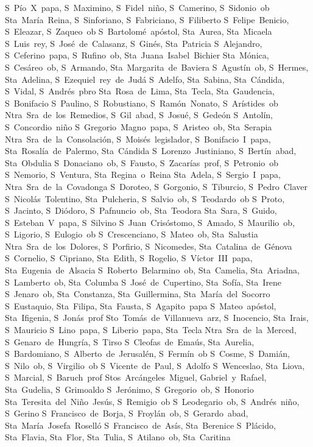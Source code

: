 S~P\'io~X~papa, S~Maximino, S~Fidel~ni\~no, S~Camerino, S~Sidonio~ob
Sta~Mar\'ia~Reina, S~Sinforiano, S~Fabriciano, S~Filiberto
S~Felipe~Benicio, S~Eleazar, S~Zaqueo~ob
S~Bartolom\'e~ap\'ostol, Sta~Aurea, Sta~Micaela
S~Luis~rey, S~Jos\'e~de~Calasanz, S~Gin\'es, Sta~Patricia
S~Alejandro, S~Ceferino~papa, S~Rufino~ob, Sta~Juana~Isabel~Bichier
Sta~M\'onica, S~Ces\'areo~ob, S~Armando, Sta~Margarita~de~Baviera
S~Agust\'in~ob, S~Hermes, Sta~Adelina, S~Ezequiel~rey~de~Jud\'a
S~Adelfo, Sta~Sabina, Sta~C\'andida, S~Vidal, S~Andr\'es~pbro
Sta~Rosa~de~Lima, Sta~Tecla, Sta~Gaudencia, S~Bonifacio
S~Paulino, S~Robustiano, S~Ram\'on~Nonato, S~Ar\'istides~ob
Ntra~Sra~de~los~Remedios, S~Gil~abad, S~Josu\'e, S~Gede\'on
S~Antol\'in, S~Concordio~ni\~no
S~Gregorio~Magno~papa, S~Aristeo~ob, Sta~Serapia
Ntra~Sra~de~la~Consolaci\'on, S~Mois\'es~legislador, S~Bonifacio~I~papa, Sta~Rosal\'ia~de~Palermo, Sta~C\'andida
S~Lorenzo~Justiniano, S~Bert\'in~abad, Sta~Obdulia
S~Donaciano~ob, S~Fausto, S~Zacar\'ias~prof, S~Petronio~ob
S~Nemorio, S~Ventura, Sta~Regina~o~Reina
Sta~Adela, S~Sergio~I~papa, Ntra~Sra~de~la~Covadonga
S~Doroteo, S~Gorgonio, S~Tiburcio, S~Pedro~Claver
S~Nicol\'as~Tolentino, Sta~Pulcheria, S~Salvio~ob, S~Teodardo~ob
S~Proto, S~Jacinto, S~Di\'odoro, S~Pafnuncio~ob, Sta~Teodora
Sta~Sara, S~Guido, S~Esteban~V~papa, S~Silvino
S~Juan~Cris\'ostomo, S~Amado, S~Maurilio~ob, S~Ligorio, S~Eulogio~ob
S~Crescenciano, S~Mateo~ob, Sta~Salustia
Ntra~Sra~de~los~Dolores, S~Porfirio, S~Nicomedes, Sta~Catalina~de~G\'enova
S~Cornelio, S~Cipriano, Sta~Edith, S~Rogelio, S~V\'ictor~III~papa, Sta~Eugenia~de~Alsacia
S~Roberto~Belarmino~ob, Sta~Camelia, Sta~Ariadna, S~Lamberto~ob, Sta~Columba
S~Jos\'e~de~Cupertino, Sta~Sof\'ia, Sta~Irene
S~Jenaro~ob, Sta~Constanza, Sta~Guillermina, Sta~Mar\'ia~del~Socorro
S~Eustaquio, Sta~Filipa, Sta~Fausta, S~Agapito~papa
S~Mateo~ap\'ostol, Sta~Ifigenia, S~Jon\'as~prof
Sto~Tom\'as~de~Villanueva~arz, S~Inocencio, Sta~Irais, S~Mauricio
S~Lino~papa, S~Liberio~papa, Sta~Tecla
Ntra~Sra~de~la~Merced, S~Genaro~de~Hungr\'ia, S~Tirso
S~Cleofas~de~Ema\'us, Sta~Aurelia, S~Bardomiano, S~Alberto~de~Jerusal\'en, S~Ferm\'in~ob
S~Cosme, S~Dami\'an, S~Nilo~ob, S~Virgilio~ob
S~Vicente~de~Paul, S~Adolfo
S~Wenceslao, Sta~Liova, S~Marcial, S~Baruch~prof
Stos~Arc\'angeles~Miguel, Gabriel~y~Rafael, Sta~Gudelia, S~Grimoaldo
S~Jer\'onimo, S~Gregorio~ob, S~Honorio
Sta~Teresita~del~Ni\~no~Jes\'us, S~Remigio~ob
S~Leodegario~ob, S~Andr\'es~ni\~no, S~Gerino
S~Francisco~de~Borja, S~Froyl\'an~ob, S~Gerardo~abad, Sta~Mar\'ia~Josefa~Rosell\'o
S~Francisco~de~As\'is, Sta~Berenice
S~Pl\'acido, Sta~Flavia, Sta~Flor, Sta~Tulia, S~Atilano~ob, Sta~Caritina
